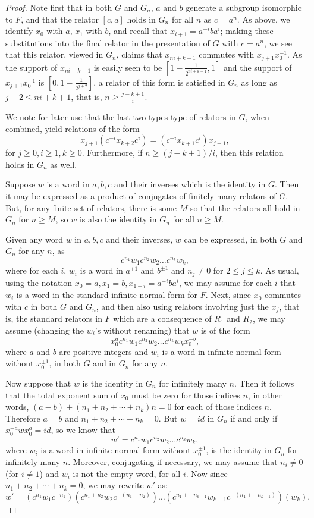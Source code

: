 \documentclass[11pt]{amsart}
\begin{document}
\begin{proof}
Note first that in both $G$ and $G_n$, $a$ and $b$ generate a
subgroup isomorphic to $F$, and that the relator $[c,a]$ holds in $G_n$ for all $n$ as $c=a^n$.
As above, we identify $x_0$ with
$a$, $x_1$ with $b$, and recall that $x_{i+1} = a^{-i}ba^i$; making these substitutions into the
final relator in the presentation of $G$ with $c=a^n$, we see that this relator, viewed in $G_n$, claims that $x_{ni+k+1}$ commutes with $x_{j+1}x_0^{-1}$.
As the support of $x_{ni+k+1}$  is easily seen to be $[1- \frac{1}{2^{ni+k+1}},1]$ and the support of $x_{j+1}x_0^{-1}$ is $[0,1- \frac{1}{2^{j+2}}]$,
a relator of this form is satisfied in $G_n$ as long as $j+2\leq ni+k+1$, that is, $n \geq \frac{j-k+1}{i}$.

We note for later use that the last two types type of relators
in $G$, when combined, yield relations of the form $$x_{j+1} (c^{-i}
x_{k+2}c^i)=(c^{-i}x_{k+1}c^i)x_{j+1},$$ for $j \geq 0, i \geq 1,
k \geq 0$. Furthermore, if $n \geq (j-k+1)/i$, then this relation
holds in $G_n$ as well.

Suppose $w$ is a word in $a,b,c$ and their inverses which is the identity in
$G$. Then it may be expressed as a product of conjugates of
finitely many relators of $G$. But, for any finite set of
relators, there is some $M$ so that the relators all hold in $G_n$
for $n \geq M$, so $w$ is also the identity in $G_n$ for all $n
\geq M$.

Given any word $w$ in $a,b,c$ and their inverses, $w$ can be expressed, in both
$G$ and $G_n$ for any $n$, as
$$c^{n_1}w_1c^{n_2}w_2\ldots c^{n_k}w_k,$$ where for each $i$, $w_i$ is a word
in $a^{\pm 1}$ and $b^{\pm 1}$ and $n_j \neq 0$ for $2 \leq j \leq k$. As usual, using the notation $x_0=a, x_1=b,
x_{1+i}=a^{-i} b a^i$, we may assume for each $i$ that $w_i$ is a word in the
standard infinite normal form for $F$. Next, since $x_0$ commutes
with $c$ in both $G$ and $G_n$, and then also using relators
involving just the $x_j$, that is, the standard relators in $F$ which are a consequence of $R_1$ and $R_2$, we may assume (changing the $w_i$'s
without renaming) that $w$ is of the form
$$x_0^ac^{n_1}w_1c^{n_2}w_2\ldots c^{n_k}w_kx_0^{-b},$$ where $a$
and $b$ are positive integers and $w_i$ is a word in infinite
normal form without $x_0^{\pm 1}$, in both $G$ and in $G_n$ for any $n$.

Now suppose that $w$ is the identity in $G_n$ for infinitely many
$n$. Then it follows that the total exponent sum of $x_0$ must be
zero for those indices $n$, in other words, $(a-b)+(n_1+n_2+\cdots
+n_k)n=0$ for each of those indices $n$. Therefore $a=b$ and
$n_1+n_2+\cdots +n_k=0$. But $w=id$ in $G_n$ if and only if
$x_0^{-a}wx_0^a=id$, so we know that
$$w'=c^{n_1}w_1c^{n_2}w_2\ldots c^{n_k}w_k,$$ where $w_i$ is a word
in infinite normal form without $x_0^{\pm 1}$, is the identity in
$G_n$ for infinitely many $n$. Moreover, conjugating if necessary,
we may assume that $n_i \neq 0$ (for $i \neq 1$) and $w_i$ is not
the empty word, for all $i$. Now since $n_1+n_2+\cdots +n_k=0$, we
may rewrite $w'$ as:
$$w'=(c^{n_1}w_1c^{-n_1})(c^{n_1+n_2}w_2c^{-(n_1+n_2)})\ldots (c^{n_1+\cdots n_{k-1}}w_{k-1}c^{-(n_1+\cdots n_{k-1})})(w_k).$$


\end{proof}
\end{document}
